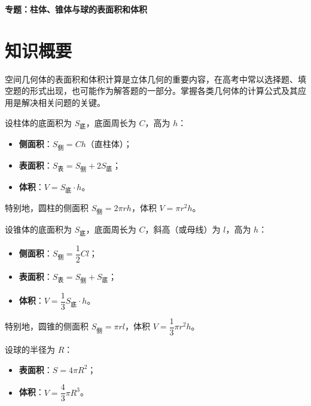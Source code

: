 \documentclass[11pt]{ctexrep}
\begin{document}
\begin{center}
    {\LARGE\bfseries 专题：柱体、锥体与球的表面积和体积}
\end{center}

\section*{知识概要}

空间几何体的表面积和体积计算是立体几何的重要内容，在高考中常以选择题、填空题的形式出现，也可能作为解答题的一部分。掌握各类几何体的计算公式及其应用是解决相关问题的关键。

\begin{definition}[柱体的表面积与体积]
    设柱体的底面积为 $S_{\text{底}}$，底面周长为 $C$，高为 $h$：
    \begin{itemize}
        \item \textbf{侧面积}：$S_{\text{侧}} = Ch$（直柱体）；
        \item \textbf{表面积}：$S_{\text{表}} = S_{\text{侧}} + 2S_{\text{底}}$；
        \item \textbf{体积}：$V = S_{\text{底}} \cdot h$。
    \end{itemize}
    
    特别地，圆柱的侧面积 $S_{\text{侧}} = 2\pi rh$，体积 $V = \pi r^2 h$。
\end{definition}

\begin{definition}[锥体的表面积与体积]
    设锥体的底面积为 $S_{\text{底}}$，底面周长为 $C$，斜高（或母线）为 $l$，高为 $h$：
    \begin{itemize}
        \item \textbf{侧面积}：$S_{\text{侧}} = \dfrac{1}{2}Cl$；
        \item \textbf{表面积}：$S_{\text{表}} = S_{\text{侧}} + S_{\text{底}}$；
        \item \textbf{体积}：$V = \dfrac{1}{3}S_{\text{底}} \cdot h$。
    \end{itemize}
    
    特别地，圆锥的侧面积 $S_{\text{侧}} = \pi rl$，体积 $V = \dfrac{1}{3}\pi r^2 h$。
\end{definition}

\begin{definition}[球的表面积与体积]
    设球的半径为 $R$：
    \begin{itemize}
        \item \textbf{表面积}：$S = 4\pi R^2$；
        \item \textbf{体积}：$V = \dfrac{4}{3}\pi R^3$。
    \end{itemize}
\end{definition}
\end{document}
